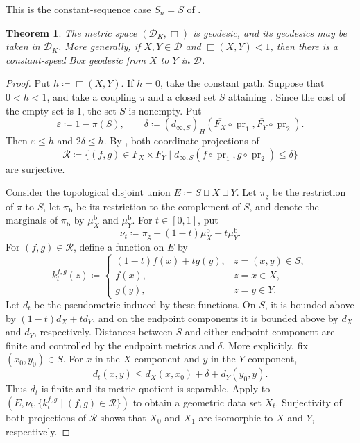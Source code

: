 \documentclass[11pt]{amsart}
\theoremstyle{plain}
\newtheorem{theorem}{Theorem}[section]
\theoremstyle{definition}
\theoremstyle{remark}
\newcommand{\D}{\mathcal D}
\newcommand{\DK}{\mathcal D_K}
\DeclareMathOperator{\pr}{pr}
\begin{document}
This is the constant-sequence case $S_n=S$ of \cite[Lemma~5.18]{gds1}.

\begin{theorem}
\label{thm:box-geodesic}
The metric space $(\DK,\Box)$ is geodesic, and its geodesics may be taken in $\DK$. More generally, if $X,Y\in\D$ and $\Box(X,Y)<1$, then there is a constant-speed Box geodesic from $X$ to $Y$ in $\D$.
\end{theorem}

\begin{proof}
Put $h\coloneqq\Box(X,Y)$. If $h=0$, take the constant path. Suppose that $0<h<1$, and take a coupling $\pi$ and a closed set $S$ attaining . Since the cost of the empty set is $1$, the set $S$ is nonempty. Put
\[
\varepsilon\coloneqq1-\pi(S),\qquad
\delta\coloneqq(d_{\infty,S})_H
(\overline{F_X}\circ\pr_1,\overline{F_Y}\circ\pr_2).
\]
Then $\varepsilon\leq h$ and $2\delta\leq h$. By , both coordinate projections of
\[
\mathcal R\coloneqq
\{(f,g)\in\overline{F_X}\times\overline{F_Y}\mid
d_{\infty,S}(f\circ\pr_1,g\circ\pr_2)\leq\delta\}
\]
are surjective.

Consider the topological disjoint union $E\coloneqq S\sqcup X\sqcup Y$. Let $\pi_{\mathrm g}$ be the restriction of $\pi$ to $S$, let $\pi_{\mathrm b}$ be its restriction to the complement of $S$, and denote the marginals of $\pi_{\mathrm b}$ by $\mu_X^{\mathrm b}$ and $\mu_Y^{\mathrm b}$. For $t\in[0,1]$, put
\[
\nu_t\coloneqq\pi_{\mathrm g}+(1-t)\mu_X^{\mathrm b}+t\mu_Y^{\mathrm b}.
\]
For $(f,g)\in\mathcal R$, define a function on $E$ by
\[
k_t^{f,g}(z)\coloneqq
\begin{cases}
(1-t)f(x)+tg(y),&z=(x,y)\in S,\\
f(x),&z=x\in X,\\
g(y),&z=y\in Y.
\end{cases}
\]
Let $d_t$ be the pseudometric induced by these functions. On $S$, it is bounded above by $(1-t)d_X+td_Y$, and on the endpoint components it is bounded above by $d_X$ and $d_Y$, respectively. Distances between $S$ and either endpoint component are finite and controlled by the endpoint metrics and $\delta$. More explicitly, fix $(x_0,y_0)\in S$. For $x$ in the $X$-component and $y$ in the $Y$-component,
\[
d_t(x,y)\leq d_X(x,x_0)+\delta+d_Y(y_0,y).
\]
Thus $d_t$ is finite and its metric quotient is separable. Apply  to $(E,\nu_t,\{k_t^{f,g}\mid(f,g)\in\mathcal R\})$ to obtain a geometric data set $X_t$. Surjectivity of both projections of $\mathcal R$ shows that $X_0$ and $X_1$ are isomorphic to $X$ and $Y$, respectively.


\end{proof}
\end{document}
